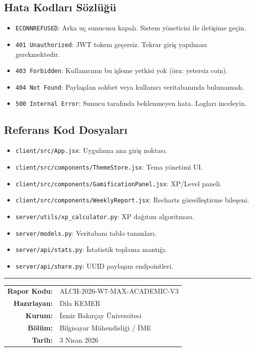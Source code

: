 \documentclass[12pt,a4paper]{article}
\begin{document}
\subsection{Hata Kodları Sözlüğü}
\begin{itemize}[leftmargin=*]
    \item \texttt{ECONNREFUSED}: Arka uç sunucusu kapalı. Sistem yöneticisi ile iletişime geçin.
    \item \texttt{401 Unauthorized}: JWT tokenı geçersiz. Tekrar giriş yapılması gerekmektedir.
    \item \texttt{403 Forbidden}: Kullanıcının bu işleme yetkisi yok (örn: yetersiz coin).
    \item \texttt{404 Not Found}: Paylaşılan sohbet veya kullanıcı veritabanında bulunamadı.
    \item \texttt{500 Internal Error}: Sunucu tarafında beklenmeyen hata. Logları inceleyin.
\end{itemize}

\subsection{Referans Kod Dosyaları}
\begin{itemize}[leftmargin=*]
    \item \texttt{client/src/App.jsx}: Uygulama ana giriş noktası.
    \item \texttt{client/src/components/ThemeStore.jsx}: Tema yönetimi UI.
    \item \texttt{client/src/components/GamificationPanel.jsx}: XP/Level paneli.
    \item \texttt{client/src/components/WeeklyReport.jsx}: Recharts görselleştirme bileşeni.
    \item \texttt{server/utils/xp\_calculator.py}: XP dağıtım algoritması.
    \item \texttt{server/models.py}: Veritabanı tablo tanımları.
    \item \texttt{server/api/stats.py}: İstatistik toplama mantığı.
    \item \texttt{server/api/share.py}: UUID paylaşım endpointleri.
\end{itemize}

\vspace{1.5cm}
\noindent\rule{\textwidth}{0.4pt}
\vspace{0.5em}
\noindent
\begin{tabular}{rl}
  \textbf{Rapor Kodu:}   & ALCH-2026-W7-MAX-ACADEMIC-V3 \\
  \textbf{Hazırlayan:}   & Dila KEMER \\
  \textbf{Kurum:}        & İzmir Bakırçay Üniversitesi \\
  \textbf{Bölüm:}        & Bilgisayar Mühendisliği / İME \\
  \textbf{Tarih:}        & 3 Nisan 2026 \\
\end{tabular}
\end{document}
